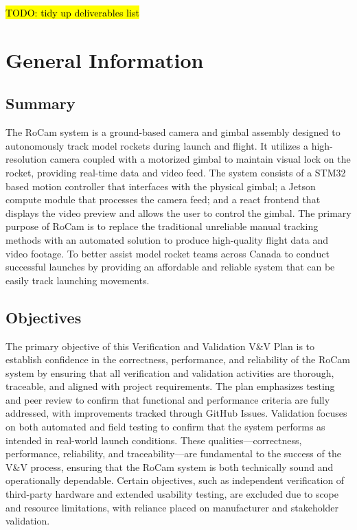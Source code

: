 \documentclass[12pt, titlepage]{article}
\begin{document}
\hl{TODO: tidy up deliverables list}


\section{General Information}

\subsection{Summary}

The RoCam system is a ground-based camera and gimbal assembly designed to
autonomously track model rockets during launch and flight. It utilizes a
high-resolution camera coupled with a motorized gimbal to maintain visual lock
on the rocket, providing real-time data and video feed. The system consists of
a STM32 based motion controller that interfaces with the physical gimbal; a
Jetson compute module that processes the camera feed; and a react frontend that
displays the video preview and allows the user to control the gimbal. The
primary purpose of RoCam is to replace the traditional unreliable manual
tracking methods with an automated solution to produce high-quality flight data
and video footage. To better assist model rocket teams across Canada to conduct
successful launches by providing an affordable and reliable system that can be
easily track launching movements.


\subsection{Objectives}
The primary objective of this Verification and Validation V\&V Plan is to
establish confidence in the correctness, performance, and reliability of the
RoCam system by ensuring that all verification and validation activities are
thorough, traceable, and aligned with project requirements. The plan emphasizes
testing and peer review to confirm that functional and performance criteria are
fully addressed, with improvements tracked through GitHub Issues. Validation
focuses on both automated and field testing to confirm that the system performs
as intended in real-world launch conditions. These qualities—correctness,
performance, reliability, and traceability—are fundamental to the success of
the V\&V process, ensuring that the RoCam system is both technically sound and
operationally dependable. Certain objectives, such as independent verification
of third-party hardware and extended usability testing, are excluded due to
scope and resource limitations, with reliance placed on manufacturer and
stakeholder validation.
\end{document}
